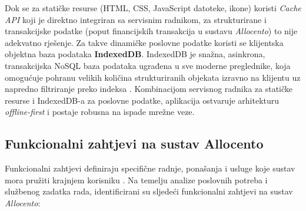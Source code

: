 \documentclass[a4paper,12pt,oneside]{article}
\begin{document}
	Dok se za statičke resurse (HTML, CSS, JavaScript datoteke, ikone) koristi \textit{Cache API} koji je direktno integriran sa servisnim radnikom, za strukturirane i transakcijske podatke (poput financijskih transakcija u sustavu \textit{Allocento}) to nije adekvatno rješenje. Za takve dinamičke poslovne podatke koristi se klijentska objektna baza podataka \textbf{IndexedDB}. IndexedDB je snažna, asinkrona, transakcijska NoSQL baza podataka ugrađena u sve moderne preglednike, koja omogućuje pohranu velikih količina strukturiranih objekata izravno na klijentu uz napredno filtriranje preko indeksa \cite{w_mdn_indexeddb}. Kombinacijom servisnog radnika za statičke resurse i IndexedDB-a za poslovne podatke, aplikacija ostvaruje arhitekturu \textit{offline-first} i postaje robusna na ispade mrežne veze.
	
	\subsection{Funkcionalni zahtjevi na sustav Allocento}
	
	Funkcionalni zahtjevi definiraju specifične radnje, ponašanja i usluge koje sustav mora pružiti krajnjem korisniku \cite{b_sommerville}. Na temelju analize poslovnih potreba i službenog zadatka rada, identificirani su sljedeći funkcionalni zahtjevi na sustav \textit{Allocento}:
	
\end{document}
